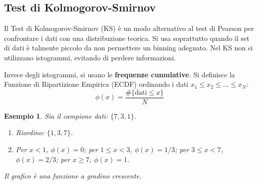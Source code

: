 \documentclass[openany,a4paper,12pt]{book}
\newtheorem{esempio}{Esempio}
\theoremstyle{remark}
\begin{document}
\begin{center}
\end{center}
\subsection{Test di Kolmogorov-Smirnov}


Il Test di Kolmogorov-Smirnov (KS) è un modo alternativo al test di Pearson per confrontare i dati con una distribuzione teorica. Si usa soprattutto quando il set di dati è talmente piccolo da non permettere un binning adeguato. Nel KS non si utilizzano istogrammi, evitando di perdere informazioni.

Invece degli istogrammi, si usano le \textbf{frequenze cumulative}. Si definisce la Funzione di Ripartizione Empirica (ECDF) ordinando i dati $x_1 \leq x_2 \leq \dots \leq x_N$:
\begin{equation*}
    \phi(x) = \frac{\#\{\text{dati} \leq x\}}{N}
\end{equation*}

\begin{esempio}
    Sia il campione dati: $\{7, 3, 1\}$.
    \begin{enumerate}
        \item Riordino: $\{1, 3, 7\}$.
        \item Per $x < 1$, $\phi(x) = 0$; per $1 \leq x < 3$, $\phi(x) = 1/3$; per $3 \leq x < 7$, $\phi(x) = 2/3$; per $x \geq 7$, $\phi(x) = 1$.
    \end{enumerate}
    Il grafico è una funzione a gradino crescente.
\end{esempio}
\end{document}
